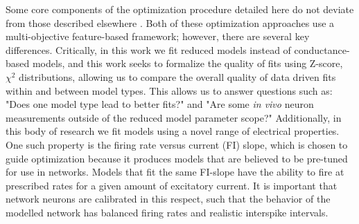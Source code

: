 

Some core components of the optimization procedure detailed here do not deviate from those described elsewhere \citep{druckmann2008evaluating,bluepyopt}. Both of these optimization approaches use a multi-objective feature-based framework; however, there are several key differences. Critically, in this work we fit reduced models instead of conductance-based models, and this work seeks to formalize the quality of fits using Z-score, $\chi^{2}$ distributions, allowing us to compare the overall quality of data driven fits within and between model types. This allows us to answer questions such as: "Does one model type lead to better fits?" and "Are some \emph{in vivo} neuron measurements outside of the reduced model parameter scope?" Additionally, in this body of research we fit models using a novel range of electrical properties. One such property is the firing rate versus current (FI) slope, which is chosen to guide optimization because it produces models that are believed to be pre-tuned for use in networks. Models that fit the same FI-slope have the ability to fire at prescribed rates for a given amount of excitatory current. It is important that network neurons are calibrated in this respect, such that the behavior of the modelled network has  balanced firing rates and realistic interspike intervals.